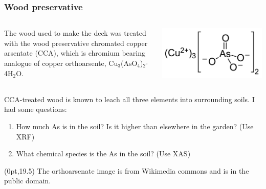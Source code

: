 \documentclass[10pt, xcolor=x11names, compress]{beamer}
\begin{document}
\begin{frame}
  \frametitle{Wood preservative}

  \begin{columns}[T]
    \begin{column}{0.6\linewidth}
      The wood used to make the deck was treated with the wood
      preservative chromated copper arsentate (CCA), which is chromium
      bearing analogue of copper orthoarsente,
      Cu$_3$(AsO$_4$)$_2$$\cdot$4H$_2$O.
    \end{column}
    \begin{column}{0.4\linewidth}
      \includegraphics[width=\linewidth]{garden/copper_arsenate.png}      
    \end{column}
  \end{columns}

  \bigskip

  \begin{block}{}
    CCA-treated wood is known to leach all three elements into
    surrounding soils.  I had some questions:

    \bigskip

    \begin{enumerate}
    \item How much As is in the soil?  Is it higher than elsewhere
      in the garden? (Use XRF)
    \item What chemical species is the As in the soil?  (Use XAS)
    \end{enumerate}
  \end{block}
  \begin{textblock*}{0.5\linewidth}(0pt,19.5\TPVertModule)%
    \tiny%
    The orthoarsenate image is from Wikimedia commons and is in the
    public domain.
  \end{textblock*}
\end{frame}
\end{document}
